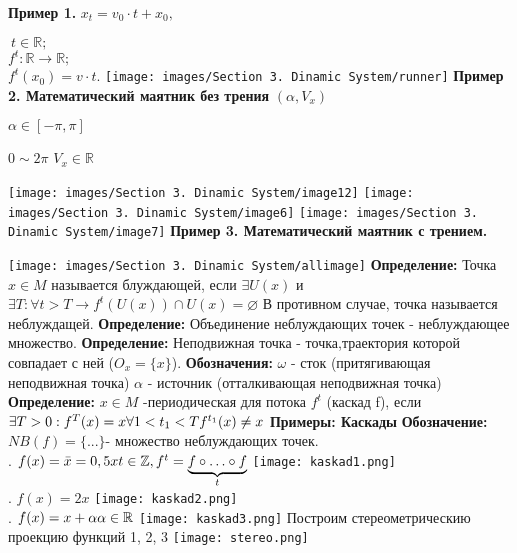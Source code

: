\documentclass[12pt,a4paper]{article}
\begin{document}
\textbf{Пример 1.} 
$x_t = v_0\cdot t + x_0,$

$~ t\in \mathbb{R};$\\

$f^t:\mathbb{R} \rightarrow \mathbb{R};$\\

$f^t(x_0) = v\cdot t.$
\texttt{[image: images/Section 3. Dinamic System/runner]}
\newpage \textbf{Пример 2. Математический маятник без трения} 
$ (\alpha ,V_x)$

$\alpha \in [-\pi , \pi]$

$0\sim 2\pi$
$V_x \in \mathbb{R}$


\texttt{[image: images/Section 3. Dinamic System/image12]}
\texttt{[image: images/Section 3. Dinamic System/image6]}
\newline
\texttt{[image: images/Section 3. Dinamic System/image7]}
 \newpage \textbf{Пример 3. Математический маятник с трением.}


\texttt{[image: images/Section 3. Dinamic System/allimage]}
\newline
\textbf{Определение:} Точка \(x\in M\) называется блуждающей, если \(\exists U(x)\) и \(\exists T : \forall t >T \rightarrow f^t(U(x))\cap U(x) = \varnothing\) 
\newline В противном случае, точка называется неблуждащей.
\newline \textbf{Определение:} Объединение неблуждающих точек - неблуждающее множество.
\newline \textbf{Определение: } Неподвижная точка - точка,траектория которой совпадает с ней (\(O_x = \{x\}\)).
\newline \textbf{Обозначения: } \(\omega\) - сток (притягивающая неподвижная точка)
\newline \(\alpha\) - источник (отталкивающая неподвижная точка)
\newline \textbf{Определение: } \(x \in M\) -периодическая для потока \(f^t\) (каскад f), если \(\exists T > 0: f^T(x)=x \forall \\ 1<t_1 <T  \\ f^{t_1}(x)\neq x\)
\newline \textbf{Примеры: Каскады}
\newline \textbf{Обозначение: } \(NB(f)=\{...\}\)- множество неблуждающих точек.
\\
. \(f(x)= \bar{x}=0,5 x \\ t\in \mathbb{Z}, f^t= \underbrace{f \circ \ldots \circ f}_t\) 
\newline \texttt{[image: kaskad1.png]}
\\
. \(f(x)=2x\) 
\newline \texttt{[image: kaskad2.png]}
\\
. \(f(x)=x+\alpha \\ \alpha \in \mathbb{R}\) 
\newline \texttt{[image: kaskad3.png]}
\newline Построим стереометрическию проекцию функций 1, 2, 3
\newline \texttt{[image: stereo.png]}
\newpage
\end{document}
